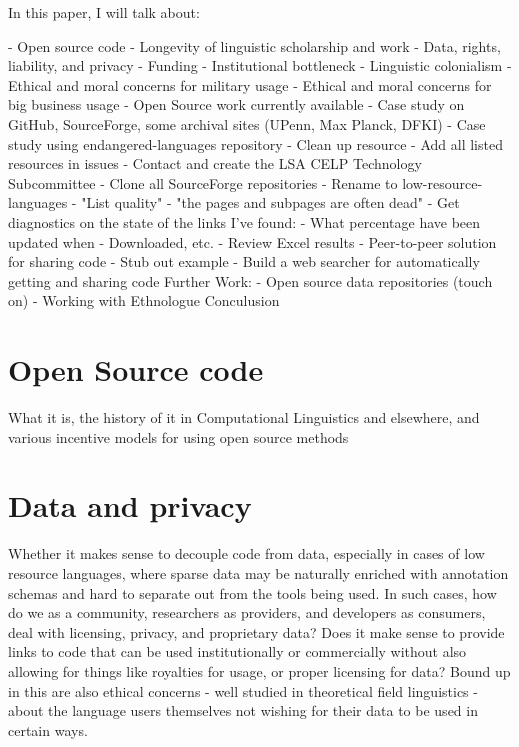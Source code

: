\documentclass[10pt, a4paper]{article}
\begin{document}
In this paper, I will talk about:

- Open source code
  -  Longevity of linguistic scholarship and work
  - Data, rights, liability, and privacy
  - Funding
    - Institutional bottleneck
    - Linguistic colonialism
    - Ethical and moral concerns for military usage
    - Ethical and moral concerns for big business usage
- Open Source work currently available
  - Case study on GitHub, SourceForge, some archival sites (UPenn, Max Planck, DFKI)
- Case study using endangered-languages repository
  - Clean up resource
    - Add all listed resources in issues
    - Contact and create the LSA CELP Technology Subcommittee
    - Clone all SourceForge repositories
    - Rename to low-resource-languages
    - "List quality"
    - "the pages and subpages are often dead"
  - Get diagnostics on the state of the links I've found:
    - What percentage have been updated when
    - Downloaded, etc.
  - Review Excel results
- Peer-to-peer solution for sharing code
  - Stub out example
  - Build a web searcher for automatically getting and sharing code
Further Work:
  - Open source data repositories (touch on)
  - Working with Ethnologue
Conculusion



\section{Open Source code}

What it is, the history of it in Computational Linguistics and elsewhere, and various incentive models for using open source methods

\section{Data and privacy}

Whether it makes sense to decouple code from data, especially in cases of low resource languages, where sparse data may be naturally enriched with annotation schemas and hard to separate out from the tools being used. In such cases, how do we as a community, researchers as providers, and developers as consumers, deal with licensing, privacy, and proprietary data? Does it make sense to provide links to code that can be used institutionally or commercially without also allowing for things like royalties for usage, or proper licensing for data? Bound up in this are also ethical concerns - well studied in theoretical field linguistics - about the language users themselves not wishing for their data to be used in certain ways.
\end{document}
